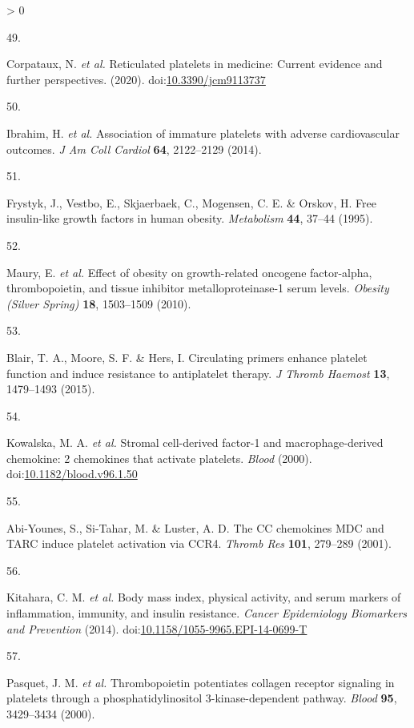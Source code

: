 \documentclass[11pt,twoside]{bristolthesis}
\newlength{\cslhangindent}
\newlength{\csllabelwidth}
\newenvironment{CSLReferences}[2] %
 {%
  \setlength{\parindent}{0pt}
  \ifodd #1 \everypar{\setlength{\hangindent}{\cslhangindent}}\ignorespaces\fi
  \ifnum #2 > 0
  \setlength{\parskip}{#2\baselineskip}
  \fi
 }%
 {}
\newcommand{\CSLLeftMargin}[1]{\parbox[t]{\csllabelwidth}{#1}}
\newcommand{\CSLRightInline}[1]{\parbox[t]{\linewidth - \csllabelwidth}{#1}\break}
\begin{document}
\begin{CSLReferences}{0}{0}
\leavevmode\hypertarget{ref-Corpataux2020}{}%
\CSLLeftMargin{49. }
\CSLRightInline{Corpataux, N. \emph{et al.} {Reticulated platelets in medicine: Current evidence and further perspectives}. (2020). doi:\href{https://doi.org/10.3390/jcm9113737}{10.3390/jcm9113737}}

\leavevmode\hypertarget{ref-Ibrahim2014}{}%
\CSLLeftMargin{50. }
\CSLRightInline{Ibrahim, H. \emph{et al.} {Association of immature platelets with adverse cardiovascular outcomes}. \emph{J Am Coll Cardiol} \textbf{64}, 2122--2129 (2014).}

\leavevmode\hypertarget{ref-Frystyk1995}{}%
\CSLLeftMargin{51. }
\CSLRightInline{Frystyk, J., Vestbo, E., Skjaerbaek, C., Mogensen, C. E. \& Orskov, H. {Free insulin-like growth factors in human obesity}. \emph{Metabolism} \textbf{44}, 37--44 (1995).}

\leavevmode\hypertarget{ref-Maury2010a}{}%
\CSLLeftMargin{52. }
\CSLRightInline{Maury, E. \emph{et al.} {Effect of obesity on growth-related oncogene factor-alpha, thrombopoietin, and tissue inhibitor metalloproteinase-1 serum levels}. \emph{Obesity (Silver Spring)} \textbf{18}, 1503--1509 (2010).}

\leavevmode\hypertarget{ref-Blair2015}{}%
\CSLLeftMargin{53. }
\CSLRightInline{Blair, T. A., Moore, S. F. \& Hers, I. {Circulating primers enhance platelet function and induce resistance to antiplatelet therapy}. \emph{J Thromb Haemost} \textbf{13}, 1479--1493 (2015).}

\leavevmode\hypertarget{ref-Kowalska2000}{}%
\CSLLeftMargin{54. }
\CSLRightInline{Kowalska, M. A. \emph{et al.} {Stromal cell-derived factor-1 and macrophage-derived chemokine: 2 chemokines that activate platelets}. \emph{Blood} (2000). doi:\href{https://doi.org/10.1182/blood.v96.1.50}{10.1182/blood.v96.1.50}}

\leavevmode\hypertarget{ref-Abi-Younes2001}{}%
\CSLLeftMargin{55. }
\CSLRightInline{Abi-Younes, S., Si-Tahar, M. \& Luster, A. D. {The CC chemokines MDC and TARC induce platelet activation via CCR4}. \emph{Thromb Res} \textbf{101}, 279--289 (2001).}

\leavevmode\hypertarget{ref-Kitahara2014}{}%
\CSLLeftMargin{56. }
\CSLRightInline{Kitahara, C. M. \emph{et al.} {Body mass index, physical activity, and serum markers of inflammation, immunity, and insulin resistance}. \emph{Cancer Epidemiology Biomarkers and Prevention} (2014). doi:\href{https://doi.org/10.1158/1055-9965.EPI-14-0699-T}{10.1158/1055-9965.EPI-14-0699-T}}

\leavevmode\hypertarget{ref-Pasquet2000}{}%
\CSLLeftMargin{57. }
\CSLRightInline{Pasquet, J. M. \emph{et al.} {Thrombopoietin potentiates collagen receptor signaling in platelets through a phosphatidylinositol 3-kinase-dependent pathway}. \emph{Blood} \textbf{95}, 3429--3434 (2000).}


\end{CSLReferences}
\end{document}
